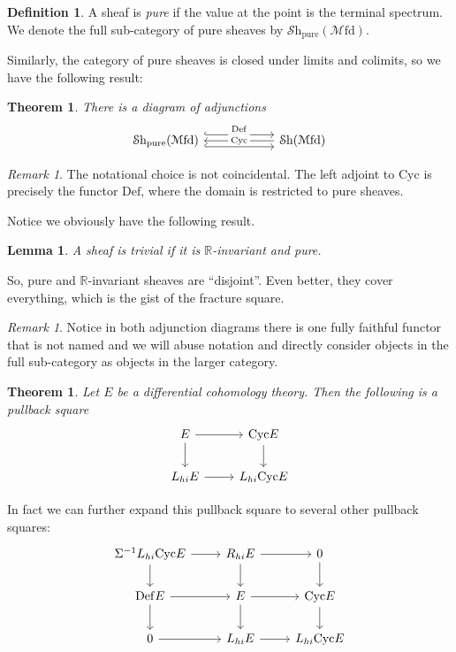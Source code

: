 \documentclass[a4paper]{book}
\newcommand{\lM}{\mathcal{M}}
\newcommand{\bR}{\mathbb{R}}
\newcommand{\lS}{\mathcal{S}}
\newcommand{\Shv}{\lS\mathrm{h}} %
\newcommand{\Mfd}{\lM\mathrm{fd}} %
\newtheorem{theorem}[equation]{Theorem}
\newtheorem{lemma}[equation]{Lemma}
\theoremstyle{definition}
\newtheorem{definition}[equation]{Definition}
\theoremstyle{remark}
\newtheorem{remark}[equation]{Remark}
\numberwithin{equation}{section}
\begin{document}
\begin{definition}
  A sheaf is \emph{pure} if the value at the point is the terminal spectrum. We denote the full sub-category of pure sheaves by $\Shv_{\mathrm{pure}}(\Mfd)$.
\end{definition}

Similarly, the category of pure sheaves is closed under limits and colimits, so we have the following result:

\begin{theorem}
 There is a diagram of adjunctions
 \[
 \begin{tikzcd}[column sep=2cm]
 \Shv_{\mathrm{pure}}(\Mfd) \arrow[r, shift left = 2, "\mathrm{Def}", hookrightarrow] \arrow[r, leftarrow, "\mathrm{Cyc}" description] \arrow[r, shift right = 2, hookrightarrow] & \Shv(\Mfd)
 \end{tikzcd}
 \]
\end{theorem}

\begin{remark}
  The notational choice is not coincidental. The left adjoint to $\mathrm{Cyc}$ is precisely the functor $\mathrm{Def}$, where the domain is restricted to pure sheaves.
\end{remark}

Notice we obviously have the following result.

\begin{lemma}
  A sheaf is \emph{trivial} if it is $\mathbb{R}$-invariant and pure.
\end{lemma}

So, pure and $\bR$-invariant sheaves are ``disjoint''. Even better, they cover everything, which is the gist of the fracture square.

\begin{remark}
Notice in both adjunction diagrams there is one fully faithful functor that is not named and we will abuse notation and directly consider objects in the full sub-category as objects in the larger category.
\end{remark}
\begin{theorem}
 Let $E$ be a differential cohomology theory. Then the following is a pullback square
 \[
  \begin{tikzcd}
    E \arrow[r] \arrow[d] & \mathrm{Cyc} E \arrow[d] \\ 
    L_{hi}E \arrow[r] & L_{hi}\mathrm{Cyc} E
  \end{tikzcd}
 \]
\end{theorem}

In fact we can further expand this pullback square to several other pullback squares:
 \[
  \begin{tikzcd}
    \Sigma^{-1}L_{hi}\mathrm{Cyc} E \arrow[d] \arrow[r] & R_{hi}E \arrow[r] \arrow[d] & 0 \arrow[d] \\ 
    \mathrm{Def} E \arrow[r] \arrow[d] & E \arrow[r] \arrow[d] & \mathrm{Cyc} E \arrow[d] \\ 
    0 \arrow[r] & L_{hi}E \arrow[r] & L_{hi}\mathrm{Cyc} E
  \end{tikzcd}
 \]
\end{document}
